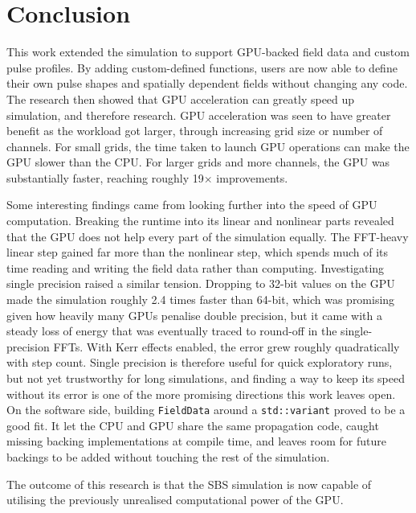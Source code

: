\chapter{Conclusion}

This work extended the simulation to support GPU-backed field data and custom pulse
profiles. By adding custom-defined functions, users are now able to define their own pulse shapes and spatially 
dependent fields without changing any code. The research then showed that GPU acceleration 
can greatly speed up simulation, and therefore research. GPU acceleration was seen to have greater 
benefit as the workload got larger, through increasing grid size or number of channels. For small grids, 
the time taken to launch GPU operations can make the GPU slower than the CPU.
For larger grids and more channels, the GPU was substantially faster, reaching roughly 19$\times$ improvements.

Some interesting findings came from looking further into the speed of GPU computation. Breaking the
runtime into its linear and nonlinear parts revealed that the GPU does not help every part of the
simulation equally. The FFT-heavy linear step gained far more than the nonlinear step, which spends
much of its time reading and writing the field data rather than computing. Investigating single
precision raised a similar tension. Dropping to 32-bit values on the GPU made the simulation roughly 2.4 times
faster than 64-bit, which was promising given how heavily many GPUs penalise double precision, but it came with
a steady loss of energy that was eventually traced to round-off in the single-precision FFTs. With
Kerr effects enabled, the error grew roughly quadratically with step count. Single precision is
therefore useful for quick exploratory runs, but not yet trustworthy for long simulations, and
finding a way to keep its speed without its error is one of the more promising directions this work
leaves open. On the software side, building \texttt{FieldData} around a \texttt{std::variant} proved
to be a good fit. It let the CPU and GPU share the same propagation code, caught missing backing
implementations at compile time, and leaves room for future backings to be added without touching
the rest of the simulation.

The outcome of this research is that the SBS simulation is now capable of utilising the previously
unrealised computational power of the GPU.
